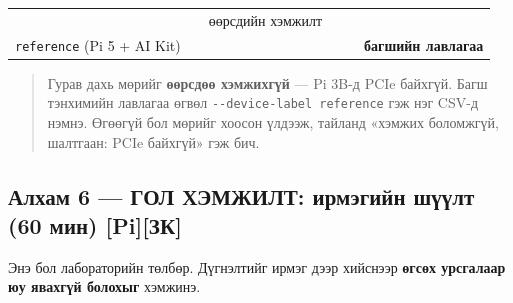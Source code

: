 \begin{longtable}[]{@{}llllll@{}}
\begin{minipage}[t]{0.14\columnwidth}
\strut
\end{minipage} & \begin{minipage}[t]{0.14\columnwidth}\raggedright
\strut
\end{minipage} & \begin{minipage}[t]{0.14\columnwidth}\raggedright
өөрсдийн хэмжилт\strut
\end{minipage}\tabularnewline
\begin{minipage}[t]{0.14\columnwidth}\raggedright
\texttt{reference} (Pi 5 + AI Kit)\strut
\end{minipage} & \begin{minipage}[t]{0.14\columnwidth}\raggedright
\strut
\end{minipage} & \begin{minipage}[t]{0.14\columnwidth}\raggedright
\strut
\end{minipage} & \begin{minipage}[t]{0.14\columnwidth}\raggedright
\strut
\end{minipage} & \begin{minipage}[t]{0.14\columnwidth}\raggedright
\strut
\end{minipage} & \begin{minipage}[t]{0.14\columnwidth}\raggedright
\textbf{багшийн лавлагаа}\strut
\end{minipage}\tabularnewline
\bottomrule
\end{longtable}\endgroup

\begin{quote}
Гурав дахь мөрийг \textbf{өөрсдөө хэмжихгүй} --- Pi 3B-д PCIe байхгүй. Багш тэнхимийн лавлагаа өгвөл \texttt{-\/\allowbreak{}-device-label\ reference} гэж нэг CSV-д нэмнэ. Өгөөгүй бол мөрийг хоосон үлдээж, тайланд «хэмжих боломжгүй, шалтгаан: PCIe байхгүй» гэж бич.
\end{quote}

\hypertarget{ux430ux43bux445ux430ux43c-6-ux433ux43eux43b-ux445ux44dux43cux436ux438ux43bux442-ux438ux440ux43cux44dux433ux438ux439ux43d-ux448ux4afux4afux43bux442-60-ux43cux438ux43d-piux437ux43a}{%
\subsection{Алхам 6 --- ГОЛ ХЭМЖИЛТ: ирмэгийн шүүлт (60 мин) {[}Pi{]}{[}ЗК{]}}\label{ux430ux43bux445ux430ux43c-6-ux433ux43eux43b-ux445ux44dux43cux436ux438ux43bux442-ux438ux440ux43cux44dux433ux438ux439ux43d-ux448ux4afux4afux43bux442-60-ux43cux438ux43d-piux437ux43a}}

Энэ бол лабораторийн төлбөр. Дүгнэлтийг ирмэг дээр хийснээр \textbf{өгсөх урсгалаар юу явахгүй болохыг} хэмжинэ.


